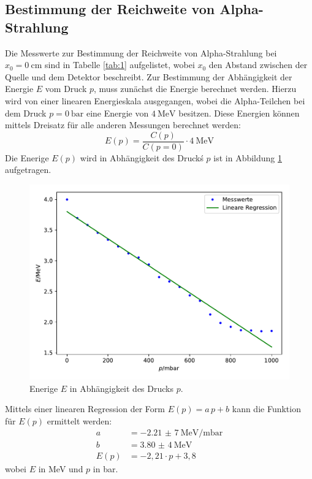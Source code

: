 \subsection{Bestimmung der Reichweite von Alpha-Strahlung}
Die Messwerte zur Bestimmung der Reichweite von Alpha-Strahlung bei $x_0=\SI{0}{\centi\meter}$ sind in Tabelle \ref{tab:1} aufgelistet, wobei $x_0$
den Abstand zwischen der Quelle und dem Detektor beschreibt.
Zur Bestimmung der Abhängigkeit der Energie $E$ vom Druck $p$, muss zunächst die Energie berechnet werden. Hierzu wird von einer linearen
Energieskala ausgegangen, wobei die Alpha-Teilchen bei dem Druck $p=\SI{0}{\bar}$ eine Energie von $\SI{4}{\mega\eV}$ besitzen. Diese Energien können
mittels Dreisatz für alle anderen Messungen berechnet werden:
\begin{equation*}
  E(p)= \frac{C(p)}{C(p=0)} \cdot \SI{4}{\mega\eV}
\end{equation*}
Die Enerige $E(p)$  wird in Abhängigkeit des Druckś $p$ ist in Abbildung \ref{abb:1} aufgetragen.
\begin{figure}
  \centering
  \includegraphics[scale=0.6]{Messung1b.pdf}
  \caption{Enerige $E$ in Abhängigkeit des Drucks $p$.}
  \label{abb:1}
\end{figure}
Mittels einer linearen Regression der Form $E(p)=a\,p+b$ kann die Funktion für $E(p)$ ermittelt werden:
\begin{align*}
  a&= \SI{-2,21(7)}{\mega\eV\per\milli\bar} \\
  b&= \SI{3,80(4)}{\mega\eV}\\
  E(p)&= -2,21 \cdot p +3,8
\end{align*}
wobei $E$ in \si{\mega\eV} und $p$ in \si{bar}.

